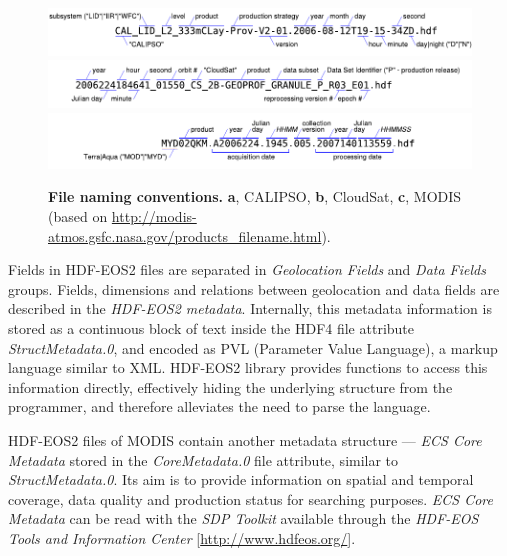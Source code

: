 \begin{figure}[h]
\raggedright
{}
\includegraphics[width=\textwidth]{images/calipso-file-naming.pdf}
\includegraphics[width=\textwidth]{images/cloudsat-file-naming.pdf}
\includegraphics[width=\textwidth]{images/modis-file-naming.pdf}
\caption[File naming conventions]{\textbf{File naming conventions.} \textbf{a}, CALIPSO, \textbf{b}, CloudSat, \textbf{c}, MODIS
(based on \url{http://modis-atmos.gsfc.nasa.gov/products_filename.html}). }
\label{fig:file-naming}
\end{figure}

Fields in HDF-EOS2 files are separated in \textit{Geolocation Fields} and
\textit{Data Fields} groups. Fields, dimensions and relations between
geolocation and data fields are described in the \textit{HDF-EOS2 metadata}. Internally,
this metadata information is stored as a continuous block of text inside the HDF4
file attribute \textit{StructMetadata.0}, and encoded as PVL (Parameter Value
Language), a markup language similar to XML. HDF-EOS2 library provides functions
to access this information directly, effectively hiding the underlying structure
from the programmer, and therefore alleviates the need to parse the language.

HDF-EOS2 files of MODIS contain another metadata structure --- \textit{ECS Core
Metadata} stored in the \textit{CoreMetadata.0} file attribute, similar to \textit{StructMetadata.0}. Its aim is to provide information on spatial
and temporal coverage, data quality and production status for searching
purposes. \textit{ECS Core Metadata} can be read with the \textit{SDP Toolkit}
available
through the \textit{HDF-EOS Tools and Information Center}
[\url{http://www.hdfeos.org/}].


